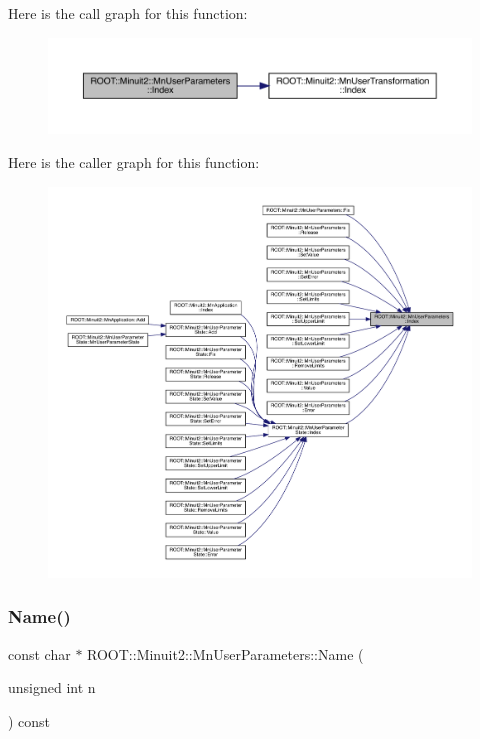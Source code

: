 Here is the call graph for this function\+:\nopagebreak
\begin{figure}[H]
\begin{center}
\leavevmode
\includegraphics[width=350pt]{d6/d10/classROOT_1_1Minuit2_1_1MnUserParameters_a30523af61ec1c817b0eb060d560f9a95_cgraph}
\end{center}
\end{figure}
Here is the caller graph for this function\+:\nopagebreak
\begin{figure}[H]
\begin{center}
\leavevmode
\includegraphics[width=350pt]{d6/d10/classROOT_1_1Minuit2_1_1MnUserParameters_a30523af61ec1c817b0eb060d560f9a95_icgraph}
\end{center}
\end{figure}
\mbox{\label{classROOT_1_1Minuit2_1_1MnUserParameters_a1228bfaf2fd8b6f27ac5c302644e5120}} 
\subsubsection{\texorpdfstring{Name()}{Name()}\hspace{0.1cm}{\footnotesize\ttfamily [1/2]}}
{\footnotesize\ttfamily const char $\ast$ R\+O\+O\+T\+::\+Minuit2\+::\+Mn\+User\+Parameters\+::\+Name (\begin{DoxyParamCaption}\item[{unsigned int}]{n }\end{DoxyParamCaption}) const}

